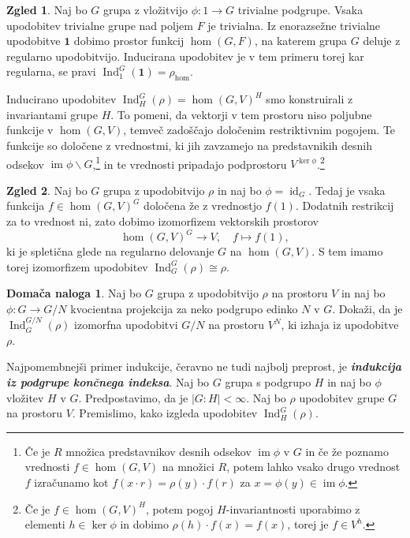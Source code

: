 \documentclass[11pt]{book}
\def\11{\mathbf{1}}
\DeclareMathOperator\image{im}
\DeclareMathOperator\Ind{Ind}
\DeclareMathOperator\id{id}
\def\definicija{\color{rdeca}\bf\em}
\theoremstyle{definition}
\theoremstyle{zgled}
\newtheorem*{zgled}{Zgled}
\theoremstyle{odprtproblem}
\theoremstyle{domacanaloga}
\newtheorem*{domacanaloga}{Domača naloga}
\theoremstyle{izrek}
\begin{document}
\begin{zgled}
Naj bo $G$ grupa z vložitvijo $\phi \colon 1 \to G$ trivialne podgrupe. Vsaka upodobitev trivialne grupe nad poljem $F$ je trivialna. Iz enorazsežne trivialne upodobitve $\11$ dobimo prostor funkcij $\hom(G,F)$, na katerem grupa $G$ deluje z regularno upodobitvijo. Inducirana upodobitev je v tem primeru torej kar regularna, se pravi $\Ind^G_1(\11) = \rho_{\hom}$.
\end{zgled}

Inducirano upodobitev $\Ind^G_H(\rho) = \hom(G,V)^H$ smo konstruirali z invariantami grupe $H$. To pomeni, da vektorji v tem prostoru niso poljubne funkcije v $\hom(G,V)$, temveč zadoščajo določenim restriktivnim pogojem. Te funkcije so določene z vrednostmi, ki jih zavzamejo na predstavnikih desnih odsekov $\image \phi \backslash G$,\footnote{Če je $R$ množica predstavnikov desnih odsekov $\image \phi$ v $G$ in če že poznamo vrednosti $f \in \hom(G,V)$ na množici $R$, potem lahko vsako drugo vrednost $f$ izračunamo kot $f(x \cdot r) = \rho(y) \cdot f(r)$ za $x = \phi(y) \in \image \phi$.} in te vrednosti pripadajo podprostoru $V^{\ker \phi}$.\footnote{Če je $f \in \hom(G,V)^H$, potem pogoj $H$-invariantnosti uporabimo z elementi $h \in \ker \phi$ in dobimo $\rho(h) \cdot f(x) = f(x)$, torej je $f \in V^h$.}

\begin{zgled}
Naj bo $G$ grupa z upodobitvijo $\rho$ in naj bo $\phi = \id_G$. Tedaj je vsaka funkcija $f \in \hom(G,V)^G$ določena že z vrednostjo $f(1)$. Dodatnih restrikcij za to vrednost ni, zato dobimo izomorfizem vektorskih prostorov
    \[
        \hom(G,V)^G \to V, \quad
        f \mapsto f(1),
    \]
ki je spletična glede na regularno delovanje $G$ na $\hom(G,V)$. S tem imamo torej izomorfizem upodobitev $\Ind^G_G(\rho) \cong \rho$.
\end{zgled}

\begin{domacanaloga}
    Naj bo $G$ grupa z upodobitvijo $\rho$ na prostoru $V$ in naj bo $\phi \colon G \to G/N$ kvocientna projekcija za neko podgrupo edinko $N$ v $G$. Dokaži, da je $\Ind^{G/N}_G(\rho)$ izomorfna upodobitvi $G/N$ na prostoru $V^N$, ki izhaja iz upodobitve $\rho$.
\end{domacanaloga}

Najpomembnejši primer indukcije, čeravno ne tudi najbolj preprost, je {\definicija indukcija iz podgrupe končnega indeksa}. Naj bo $G$ grupa s podgrupo $H$ in naj bo $\phi$ vložitev $H$ v $G$. Predpostavimo, da je $|G:H| < \infty$. Naj bo $\rho$ upodobitev grupe $G$ na prostoru $V$. Premislimo, kako izgleda upodobitev $\Ind^G_H(\rho)$. 
    
\end{document}
